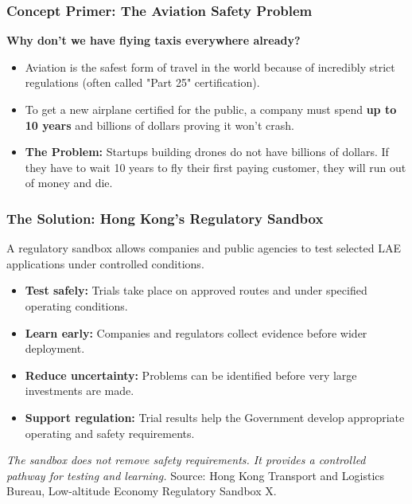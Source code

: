 \documentclass{beamer}
\begin{document}
\begin{frame}[t]
  \frametitle{Concept Primer: The Aviation Safety Problem}
  
  \textbf{Why don't we have flying taxis everywhere already?}

  \vspace{0.3cm}
  \begin{itemize}
      \item Aviation is the safest form of travel in the world because of incredibly strict regulations (often called "Part 25" certification). 
      \item To get a new airplane certified for the public, a company must spend \textbf{up to 10 years} and billions of dollars proving it won't crash.
      \item \textbf{The Problem:} Startups building drones do not have billions of dollars. If they have to wait 10 years to fly their first paying customer, they will run out of money and die.
  \end{itemize}
\end{frame}

\begin{frame}[t]
  \frametitle{The Solution: Hong Kong's Regulatory Sandbox}
  A regulatory sandbox allows companies and public agencies to test selected LAE applications under controlled conditions.
  \begin{itemize}
    \item \textbf{Test safely:} Trials take place on approved routes and under specified operating conditions.
    \item \textbf{Learn early:} Companies and regulators collect evidence before wider deployment.
    \item \textbf{Reduce uncertainty:} Problems can be identified before very large investments are made.
    \item \textbf{Support regulation:} Trial results help the Government develop appropriate operating and safety requirements.
  \end{itemize}
  \textit{The sandbox does not remove safety requirements. It provides a controlled pathway for testing and learning.}
  \vfill
  {\tiny Source: Hong Kong Transport and Logistics Bureau, Low-altitude Economy Regulatory Sandbox X.}
\end{frame}
\end{document}
